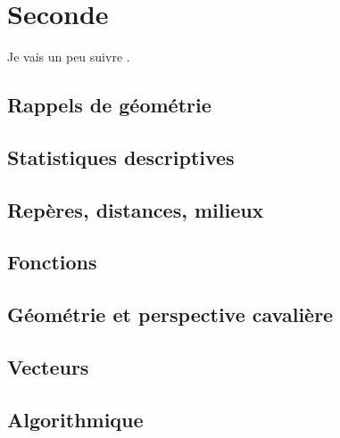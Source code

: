 \documentclass[a4paper,12pt]{book}
\begin{document}




\newpage



\tableofcontents

\newpage

\part{Seconde}

Je vais un peu suivre \cite{oklaEg}.
\setcounter{chapter}{-1}

\chapter{Rappels de géométrie}


\chapter{Statistiques descriptives}




\chapter{Repères, distances, milieux}


\chapter{Fonctions}


\chapter{Géométrie et perspective cavalière}


\chapter{Vecteurs}


\chapter{Algorithmique}

\end{document}
